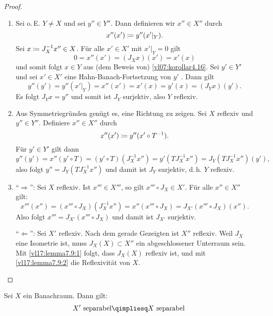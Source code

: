 \begin{proof}
    \begin{enumerate}[(1)]
        \item 
            Sei o.\,E. $Y\neq X$ und sei $y''\in Y''$. Dann definieren wir
            $x''\in X''$ durch
            \[ x''(x') \coloneqq y''( x'\vert_Y )  . \]
            Sei $x\coloneqq J_X^{-1} x'' \in X$. Für alle $x'\in X'$ mit
            $x'\vert_Y = 0$ gilt
            \[ 0 = x''(x') = (J_X x)(x') = x'(x) \]
            und somit folgt $x\in Y$ aus (dem Beweis von)
            \cref{vl07:korollar4.16}. Sei $y'\in Y'$ und sei $x'\in X'$ eine
            Hahn-Banach-Fortsetzung von $y'$ . Dann gilt
            \[ y''(y') = y''(x'\vert_Y)
                = x''(x') = x'(x) = y'(x) = (J_Yx)(y')
            . \]
            Es folgt $J_Y x = y''$ und somit ist $J_Y$ surjektiv, also $Y$
            reflexiv.
            
        \item
            Aus Symmetriegründen genügt es, eine Richtung zu zeigen.
            Sei $X$ reflexiv und $y''\in Y''$. Definiere $x''\in X''$ durch
            \[ x''(x') \coloneqq y''(x'\circ T^{-1})  . \]
            Für $y'\in Y'$ gilt dann
            \[ y''(y') = x''(y'\circ T) = (y'\circ T)(J_X^{-1} x'')
                = y'(T J_X^{-1} x'') = J_Y(T J_X^{-1} x'')(y')
            , \]
            also folgt $y'' = J_Y(T J_X^{-1} x'')$ und damit ist $J_Y$ surjektiv,
            d.\,h. $Y$ reflexiv.
            
        \item
            \enquote{$\Rightarrow$}: Sei $X$ reflexiv. Ist $x'''\in X'''$, so gilt
            $x''' \circ J_X \in X'$. Für alle $x''\in X''$ gilt:
            \[ x'''(x'') = (x''' \circ J_X)(J_X^{-1} x'')
                = x''(x'''\circ J_X) = J_{X'}(x'''\circ J_X)(x'')
            . \]
            Also folgt $x''' = J_{X'}(x'''\circ J_X)$ und damit ist $J_{X'}$
            surjektiv.
            
            \enquote{$\Leftarrow$}: Sei $X'$ reflexiv. Nach dem gerade Gezeigten
            ist $X''$ reflexiv. Weil $J_X$ eine Isometrie ist, muss $J_X(X)
            \subset X''$ ein abgeschlossener Unterraum sein. Mit
            \ref{vl17:lemma7.9:1} folgt, dass $J_X(X)$ reflexiv ist, und mit
            \ref{vl17:lemma7.9:2} die Reflexivität von $X$.
    \end{enumerate}
\end{proof}

\pagebreak[2]
\begin{thLemma} \label{vl17:lemma7.10}
    Sei $X$ ein Banachraum. Dann gilt:
    \[ X'\text{ separabel} \qimpliesq X\text{ separabel} \]
\end{thLemma}

